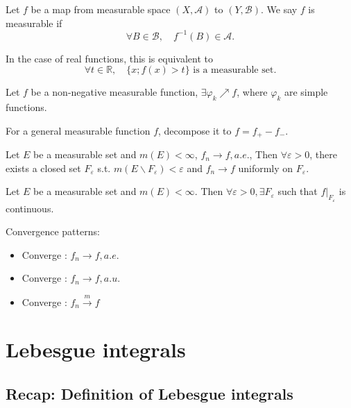 \begin{definition}
	Let $f$ be a map from measurable space $(X, \mathcal{A})$ to $(Y, \mathcal{B})$.
	We say $f$ is measurable if
	 \[
	\forall B\in \mathcal{B}, \quad f^{-1}(B)\in \mathcal{A}
	.\]
	
	In the case of real functions, this is equivalent to
	\[
		\forall t\in \mathbb{R}, \quad \{x; f(x)>t\} \text{ is a measurable set}
	.\]
\end{definition}

\begin{proposition}
    Let $f$ be a non-negative measurable function,
	$\exists \varphi_k \nearrow f$,
	where $\varphi_k$ are simple functions.

	For a general measurable function $f$, decompose it to $f=f_+-f_-$. 
\end{proposition}

\begin{theorem}[Egorov]
    Let $E$ be a measurable set and $m(E)<\infty$, $f_n\to f, a.e.$,
	Then  $\forall\varepsilon>0$, there exists a closed set $F_\varepsilon$ s.t.
	$m(E\backslash F_{\varepsilon})<\varepsilon$ and
	$f_n\to f$ uniformly on $F_{\varepsilon}$.
\end{theorem}

\begin{theorem}[Lusin]
    Let $E$ be a measurable set and  $m(E)<\infty$.
	Then $\forall \varepsilon>0, \exists F_{\varepsilon}$ such that
	$f \big|_{F_\varepsilon}$ is continuous.
\end{theorem}

Convergence patterns:
\begin{itemize}
	\item Converge : $f_n\to f, a.e.$
	\item Converge : $f_n\to f, a.u.$
	\item Converge : $f_n\xrightarrow{m} f$
\end{itemize}

\section{Lebesgue integrals}
\label{sec:Lebesgue integrals}

\subsection{Recap: Definition of Lebesgue integrals}
\label{sub:Definition of Lebesgue integrals}

